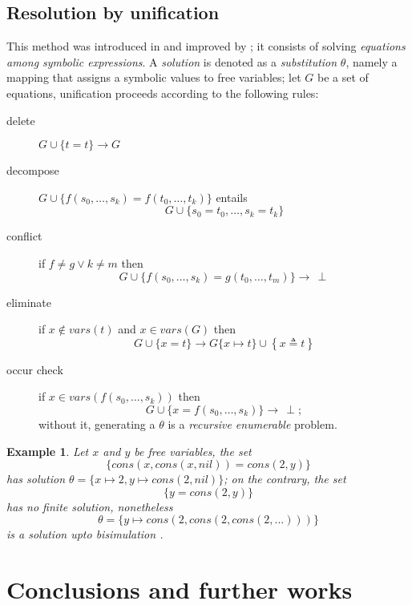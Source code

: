 \documentclass[a4paper,12pt]{article}
\newtheorem{example}[theorem]{Example}
\begin{document}
\subsection{Resolution by unification} 

This method was introduced in \citep{robinson_unif} and
improved by \citep{Martelli:1982:EUA:357162.357169}; it consists of solving
\textit{equations among symbolic expressions}. A \textit{solution} is denoted
as a \textit{substitution} $\theta$, namely a mapping that assigns a symbolic
values to free variables; let $G$ be a set of equations, unification proceeds
according to the following rules:
\begin{description}
\item[delete] $G \cup \lbrace t = t \rbrace \rightarrow G$
\item[decompose] $G \cup \lbrace f(s_{0}, \ldots, s_{k}) = f(t_{0}, \ldots, t_{k})\rbrace$ entails
$$G \cup \lbrace s_{0}=t_{0},\ldots, s_{k}=t_{k} \rbrace$$
\item[conflict] if $f\neq g \vee k\neq m$ then $$G \cup \lbrace f(s_{0}, \ldots, s_{k}) = g(t_{0}, \ldots, t_{m})\rbrace \rightarrow \,\perp$$
\item[eliminate] if $x \not\in vars(t)$ and $x \in vars(G)$ then $$G \cup \lbrace x = t\rbrace \rightarrow G\lbrace x \mapsto t\rbrace \cup \left\lbrace x \triangleq t\right\rbrace $$
\item[occur check] if $x \in vars(f(s_{0},\ldots,s_{k}))$ then $$G \cup \lbrace x = f(s_{0}, \ldots, s_{k})\rbrace \rightarrow \,\perp;$$
without it, generating a $\theta$ is a
\emph{recursive enumerable} problem.
\end{description}

\begin{example}
Let $x$ and $y$ be free variables, the set
$$\lbrace cons(x,cons(x,nil)) = cons(2,y)\rbrace$$
has solution $\theta = \lbrace x \mapsto 2, y \mapsto cons(2,nil) \rbrace$;
on the contrary, the set
$$ \lbrace y = cons(2,y) \rbrace $$
has no \textit{finite} solution, nonetheless
$$\theta = \lbrace y \mapsto cons(2,cons(2,cons(2,...))) \rbrace$$
is a solution upto \textit{bisimulation}
\citep{10.1007/BFb0017309, DBLP:books/daglib/0067019}.
\end{example}
\section{Conclusions and further works}
\end{document}
